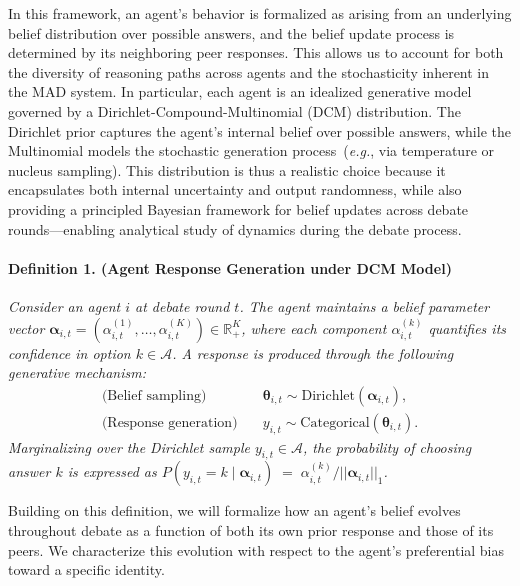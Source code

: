 \documentclass{article}
\begin{document}
In this framework, an agent’s behavior is formalized as arising from an underlying belief distribution over possible answers, and the belief update process is determined by its neighboring peer responses.
This allows us to account for both the diversity of reasoning paths across agents and the stochasticity inherent in the MAD system.
In particular, each agent is an idealized generative model governed by a Dirichlet-Compound-Multinomial (DCM) distribution. The Dirichlet prior captures the agent’s internal belief over possible answers, while the Multinomial models the stochastic generation process~(\textit{e.g.}, via temperature or nucleus sampling).  This distribution is thus a realistic choice because it encapsulates both internal uncertainty and output randomness, while also providing a principled Bayesian framework for belief updates across debate rounds—enabling analytical study of dynamics during the debate process. 

\paragraph{Definition 1. (Agent Response Generation under DCM Model)}  
\textit{Consider an agent \(i\) at debate round \(t\). The agent maintains a belief parameter vector \(\boldsymbol{\alpha}_{i,t} = (\alpha_{i,t}^{(1)}, \dots, \alpha_{i,t}^{(K)}) \in \mathbb{R}_{+}^K\), where each component \(\alpha_{i,t}^{(k)}\) quantifies its confidence in option \(k \in \mathcal{A}\). A response is produced through the following generative mechanism:  
\begin{align*}
\text{(Belief sampling)} \quad & \boldsymbol{\theta}_{i,t} \sim \mathrm{Dirichlet}(\boldsymbol{\alpha}_{i,t}), \\
\text{(Response generation)} \quad & y_{i,t} \sim \mathrm{Categorical}(\boldsymbol{\theta}_{i,t}).
\end{align*}
Marginalizing over the Dirichlet sample $y_{i,t} \in \mathcal{A}$, the probability of choosing answer \(k\) is expressed as  $P(y_{i,t}=k \mid \boldsymbol{\alpha}_{i,t}) \;=\; \alpha_{i,t}^{(k)} / ||\boldsymbol{\alpha}_{i,t}||_1$.~
}  \vspace{2mm}

Building on this definition, we will formalize how an agent’s belief evolves throughout debate as a function of both its own prior response and those of its peers. 
We characterize this evolution with respect to the agent’s preferential bias toward a specific identity.
\end{document}
